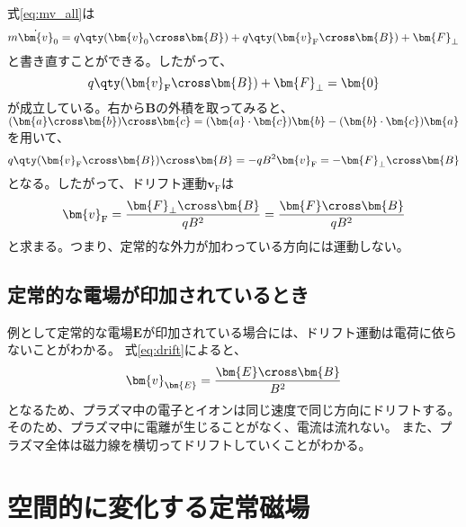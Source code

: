 式\eqref{eq:mv_all}は
\begin{equation}
	m\dot{\bm{v}}_0 = q\qty(\bm{v}_0\cross\bm{B}) + q\qty(\bm{v}_{\text{F}}\cross\bm{B}) + \bm{F}_{\perp}
\end{equation}
と書き直すことができる。したがって、
\begin{equation}
	q\qty(\bm{v}_{\text{F}}\cross\bm{B}) + \bm{F}_{\perp} = \bm{0}
\end{equation}
が成立している。右から$\bm{B}$の外積を取ってみると、$(\bm{a}\cross \bm{b})\cross \bm{c} = (\bm{a}\cdot \bm{c})\bm{b} - (\bm{b}\cdot \bm{c})\bm{a}$を用いて、
\begin{equation}
	q\qty(\bm{v}_{\text{F}}\cross\bm{B})\cross\bm{B} = -qB^2\bm{v}_{\text{F}} = -\bm{F}_{\perp}\cross\bm{B}
\end{equation}
となる。したがって、ドリフト運動$\bm{v}_{\text{F}}$は
\begin{equation}
	\bm{v}_{\text{F}} = \frac{\bm{F}_{\perp}\cross\bm{B}}{qB^2} = \frac{\bm{F}\cross\bm{B}}{qB^2}
	\label{eq:drift}
\end{equation}
と求まる。つまり、定常的な外力が加わっている方向には運動しない。
\subsection{定常的な電場が印加されているとき}
例として定常的な電場$\bm{E}$が印加されている場合には、ドリフト運動は電荷に依らないことがわかる。
式\eqref{eq:drift}によると、
\begin{equation}
	\bm{v}_{\bm{E}} = \frac{\bm{E}\cross\bm{B}}{B^2}
\end{equation}
となるため、プラズマ中の電子とイオンは同じ速度で同じ方向にドリフトする。そのため、プラズマ中に電離が生じることがなく、電流は流れない。
また、プラズマ全体は磁力線を横切ってドリフトしていくことがわかる。

\newpage
\section{空間的に変化する定常磁場}
